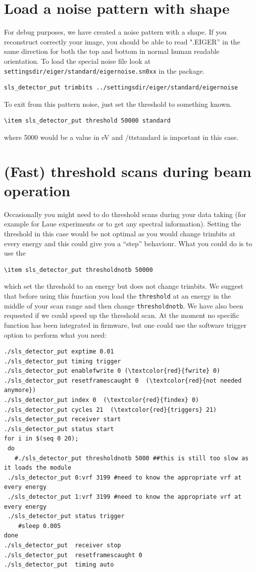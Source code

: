 \documentclass{article}
\begin{document}
{{{\section{Load a noise pattern with shape}
For debug purposes, we have created a noise pattern with a shape. If you reconstruct correctly your image, you should be able to read ".EIGER'' in the same direction for both the top and bottom in normal human readable orientation.
To load the special noise file look at {\tt{settingsdir/eiger/standard/eigernoise.sn0xx}} in the package. 
\begin{verbatim}
sls_detector_put trimbits ../settingsdir/eiger/standard/eigernoise
\end{verbatim}
To exit from this pattern noise, just set the threshold to something known. 
\begin{verbatim}
\item sls_detector_put threshold 50000 standard
\end{verbatim}
where 5000 would be a value in eV and {/tt{standard}} is important in this case.

\section{(Fast) threshold scans during beam operation}\label{sec:fastthresholdscan}
Occasionally you might need to do threshold scans during your data taking (for example for Laue experiments or to get any spectral information). Setting the threshold in this case would be not optimal as you would change trimbits at every energy and this could give you a ``step'' behaviour. What you could do is to use the 
\begin{verbatim}
\item sls_detector_put thresholdnotb 50000 
\end{verbatim}
 which set the threshold to an energy but does not change trimbits. We suggest that before using this function you load the {\tt{threshold}} at an energy in the middle of your scan range and then change {\tt{thresholdnotb}}.
We have also been requested if we could speed up the threshold scan. At the moment no specific function has been integrated in firmware, but one could use the software trigger option to perform what you need:
\begin{verbatim}
./sls_detector_put exptime 0.01
./sls_detector_put timing trigger
./sls_detector_put enablefwrite 0 (\textcolor{red}{fwrite} 0)
./sls_detector_put resetframescaught 0  (\textcolor{red}{not needed anymore})
./sls_detector_put index 0  (\textcolor{red}{findex} 0)
./sls_detector_put cycles 21  (\textcolor{red}{triggers} 21)
./sls_detector_put receiver start
./sls_detector_put status start 
for i in $(seq 0 20); 
 do
   #./sls_detector_put thresholdnotb 5000 ##this is still too slow as it loads the module 
 ./sls_detector_put 0:vrf 3199 #need to know the appropriate vrf at every energy 
 ./sls_detector_put 1:vrf 3199 #need to know the appropriate vrf at every energy 
 ./sls_detector_put status trigger
    #sleep 0.005
done
./sls_detector_put  receiver stop
./sls_detector_put  resetframescaught 0 
./sls_detector_put  timing auto
\end{verbatim} 

}}}
\end{document}
